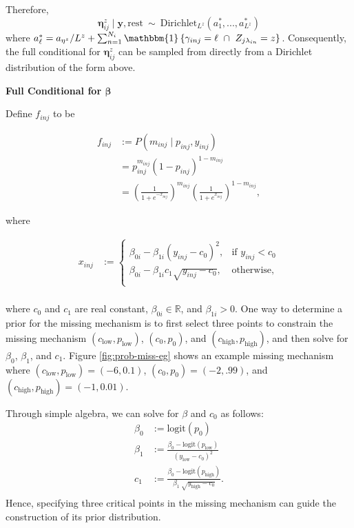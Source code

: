\documentclass[12pt,]{article}
\newcommand{\p}[1]{\left(#1\right)}
\newcommand{\bc}[1]{ \left\{#1\right\} }
\def\beginmyfig{\begin{figure}[H]\center}
\def\endmyfig{\end{figure}}
\def\logit{\text{logit}}
\def\Dir{\text{Dirichlet}}
\def\lin{\lambda_{in}}
\def\y{\bm{y}}
\newcommand{\Ind}[1]{\mathbbm{1}\bc{#1}}
\def\rest{\text{rest}}
\def\beginmyfig{\begin{figure}[H]\center}
\def\endmyfig{\end{figure}}
\begin{document}
Therefore, \[
\bm{\eta}^z_{ij} \mid \y,\rest ~\sim~ \Dir_{L^z}\p{a^*_1,...,a^*_{L^z}}
\] where
\(a^*_\ell = a_{\eta^z}/L^z+\sum_{n=1}^{N_i}\Ind{\gamma_{inj}=\ell ~\cap~
Z_{j\lin}=z}\).
Consequently, the full conditional for \(\bm{\eta}^z_{ij}\) can be
sampled from directly from a Dirichlet distribution of the form above.
\vspace{2em}


\textbf{Full Conditional for $\bm\beta$}

Define \(f_{inj}\) to be

\begin{align*}
f_{inj} &:= P(m_{inj} \mid p_{inj}, y_{inj}) \\
&= p_{inj}^{m_{inj}} (1-p_{inj})^{1 - m_{inj}} \\
&= \left(\frac{1}{1+e^{-x_{inj}}}
\right)^{m_{inj}}\left(\frac{1}{1+e^{x_{inj}}} \right)^{1-m_{inj}},
\end{align*}

where

\begin{align*}
  x_{inj} &:= \begin{cases}
  \beta_{0i} - \beta_{1i}(y_{inj}-c_0)^2, & \text{if } y_{inj} < c_0\nonumber \\
  \beta_{0i} - \beta_{1i}c_1\sqrt{y_{inj}-c_0}, & \text{otherwise}, \nonumber \\
  \end{cases}\\
\end{align*}

where \(c_0\) and \(c_1\) are real constant, $\beta_{0i} \in \mathbb{R}$, and
$\beta_{1i} > 0$.
One way to determine a prior for the missing mechanism is to first select three
points to constrain the missing mechanism $(c_\text{low}, p_\text{low})$,
$(c_0, p_0)$, and $(c_\text{high}, p_\text{high})$, and then 
solve for $\beta_0$, $\beta_1$, and $c_1$. Figure \ref{fig:prob-miss-eg} shows
an example missing mechanism where $(c_\text{low}, p_\text{low}) = (-6,0.1)$,
$(c_0, p_0)=(-2,.99)$, and $(c_\text{high}, p_\text{high}) = (-1,0.01)$.

Through simple algebra, we can solve for $\beta$ and $c_0$ as follows:
\begin{align*}
  \beta_0 &:= \logit(p_0) \\
  \beta_1 &:= \frac{\beta_0 - \logit(p_\text{low})}{(y_\text{low} - c_0)^2} \\
  c_1 &:= \frac{\beta_0 - \logit(p_\text{high})}{\beta_1 ~ \sqrt{y_\text{high}
  - c_0} }. \\
\end{align*}
Hence, specifying three critical points in the missing mechanism can guide
the construction of its prior distribution.
\vspace{2em}
\end{document}
